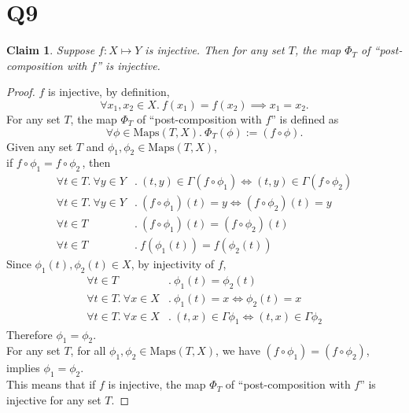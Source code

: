 \documentclass[12pt]{article}
\newtheorem*{claim}{Claim}
\begin{document}
\section*{Q9}
\begin{claim}
    Suppose $f: X \mapsto Y$ is injective. Then for any set $T$,
    the map $\Phi_T$ of ``post-composition with $f$'' is injective.
\end{claim}
\begin{proof}
    $f$ is injective, by definition, $$\forall x_1, x_2 \in X.~ f(x_1) = f(x_2) \implies x_1 = x_2.$$
    For any set $T$, the map $\Phi_T$ of ``post-composition with $f$'' is defined as
    $$\forall \phi \in \text{Maps}(T, X).~ \Phi_T(\phi) := (f \circ \phi).$$
    Given any set $T$ and $\phi_1, \phi_2 \in \text{Maps}(T, X)$,\\
    if $f \circ \phi_1 = f \circ \phi_2\,$, then
        \begin{align*}
            \forall t \in T.~ \forall y \in Y&.~ (t,y) \in \Gamma(f \circ \phi_1) \iff (t,y) \in \Gamma(f \circ \phi_2)\\
            \forall t \in T.~ \forall y \in Y&.~ (f \circ \phi_1)(t) = y \iff (f \circ \phi_2)(t) = y\\
            \forall t \in T&.~ (f \circ \phi_1)(t) = (f \circ \phi_2)(t)\\
            \forall t \in T&.~ f(\phi_1(t)) = f(\phi_2(t))
        \end{align*}
    Since $\phi_1(t), \phi_2(t) \in X$, by injectivity of $f$,
        \begin{align*}
            \forall t \in T&.~ \phi_1(t) = \phi_2(t)\\
            \forall t \in T.~ \forall x \in X&.~ \phi_1(t) = x \iff \phi_2(t) = x\\
            \forall t \in T.~ \forall x \in X&.~ (t,x) \in \Gamma \phi_1 \iff (t,x) \in \Gamma \phi_2
        \end{align*}
    Therefore $\phi_1 = \phi_2$.\\
    For any set $T$, for all $\phi_1, \phi_2 \in \text{Maps}(T, X)$, we have $(f \circ \phi_1) = (f \circ \phi_2)$, implies $\phi_1 = \phi_2$.\\
    This means that if $f$ is injective, the map $\Phi_T$ of ``post-composition with $f$'' is injective for any set $T$.
\end{proof}
\newpage
\end{document}
